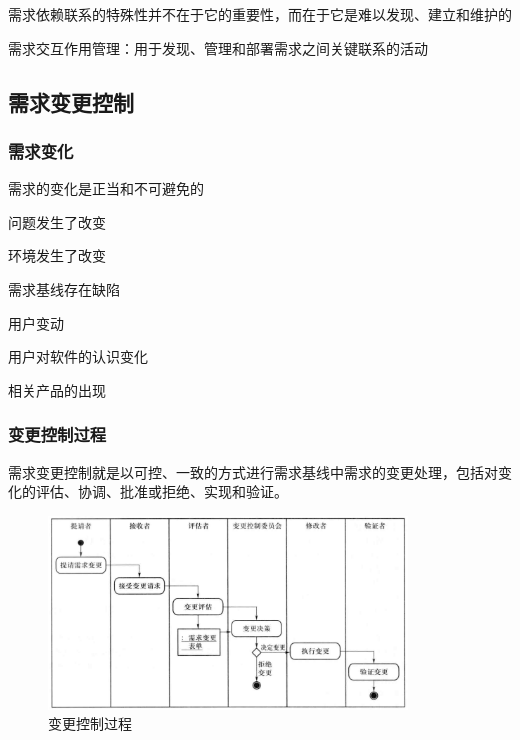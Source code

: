 需求依赖联系的特殊性并不在于它的重要性，而在于它是难以发现、建立和维护的

需求交互作用管理：用于发现、管理和部署需求之间关键联系的活动

\subsection{需求变更控制}

\subsubsection{需求变化}
需求的变化是正当和不可避免的
\vspace{-0.8em}
\begin{multicols}{3}
    \begin{itemize}
        \item 问题发生了改变
        \item 环境发生了改变
        \item 需求基线存在缺陷
        {\fangsong
        \item 用户变动
        \item 用户对软件的认识变化
        \item 相关产品的出现}
    \end{itemize}
\end{multicols}
\vspace{-1em}


\subsubsection{变更控制过程}
需求变更控制就是以可控、一致的方式进行需求基线中需求的变更处理，包括对变化的评估、协调、批准或拒绝、实现和验证。

\begin{figure}[H]
	\centering
	\includegraphics[width=0.85\textwidth]{img/变更控制过程.png}
    \caption*{变更控制过程}
    \vspace{-1em}
\end{figure}

